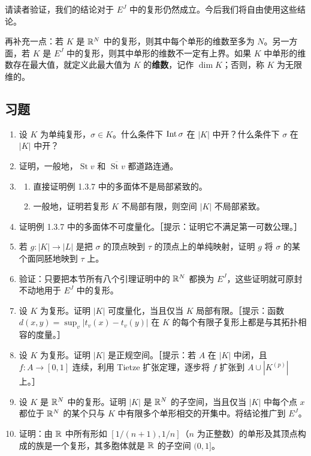 请读者验证，我们的结论对于 $E^J$ 中的复形仍然成立。今后我们将自由使用这些结论。

再补充一点：若 $K$ 是 $\mathbb{R}^N$ 中的复形，则其中每个单形的维数至多为 $N$。另一方面，若 $K$ 是 $E^J$ 中的复形，则其中单形的维数不一定有上界。如果 $K$ 中单形的维数存在最大值，就定义此最大值为 $K$ 的\textbf{维数}，记作 $\dim K$；否则，称 $K$ 为无限维的。

\subsection*{习题}
\begin{enumerate}
\item 设 $K$ 为单纯复形，$\sigma\in K$。什么条件下 $\operatorname{Int}\sigma$ 在 $|K|$ 中开？什么条件下 $\sigma$ 在 $|K|$ 中开？
\item 证明，一般地，$\operatorname{St}v$ 和 $\overline{\operatorname{St}v}$ 都道路连通。
\item \begin{enumerate}[label=(\alph*)]
\item 直接证明例 1.3.7 中的多面体不是局部紧致的。
\item 一般地，证明若复形 $K$ 不局部有限，则空间 $|K|$ 不局部紧致。
\end{enumerate}
\item 证明例 1.3.7 中的多面体不可度量化。［提示：证明它不满足第一可数公理。］
\item 若 $g:|K|\to|L|$ 是把 $\sigma$ 的顶点映到 $\tau$ 的顶点上的单纯映射，证明 $g$ 将 $\sigma$ 的某个面同胚地映到 $\tau$ 上。
\item 验证：只要把本节所有八个引理证明中的 $\mathbb{R}^N$ 都换为 $E^J$，这些证明就可原封不动地用于 $E^J$ 中的复形。
\item 设 $K$ 为复形。证明 $|K|$ 可度量化，当且仅当 $K$ 局部有限。［提示：函数 $d(x,y)=\sup_v|t_v(x)-t_v(y)|$ 在 $K$ 的每个有限子复形上都是与其拓扑相容的度量。］
\item 设 $K$ 为复形。证明 $|K|$ 是正规空间。［提示：若 $A$ 在 $|K|$ 中闭，且 $f:A\to[0,1]$ 连续，利用 Tietze 扩张定理，逐步将 $f$ 扩张到 $A\cup|K^{(p)}|$ 上。］
\item 设 $K$ 是 $\mathbb{R}^N$ 中的复形。证明 $|K|$ 是 $\mathbb{R}^N$ 的子空间，当且仅当 $|K|$ 中每个点 $x$ 都位于 $\mathbb{R}^N$ 的某个只与 $K$ 中有限多个单形相交的开集中。将结论推广到 $E^J$。
\item 证明：由 $\mathbb{R}$ 中所有形如 $[1/(n+1),1/n]$（$n$ 为正整数）的单形及其顶点构成的族是一个复形，其多胞体就是 $\mathbb{R}$ 的子空间 $(0,1]$。
\end{enumerate}
